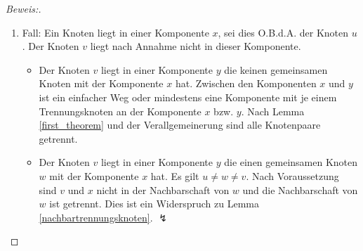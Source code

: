 \begin{proof}[Beweis:]
\begin{enumerate}
\begin{itemize}
\end{itemize}  
\item Fall: Ein Knoten liegt in einer Komponente $x$, sei dies O.B.d.A. der Knoten $u$. Der Knoten $v$ liegt nach Annahme nicht in dieser Komponente. 
\begin{itemize}
\item Der Knoten $v$ liegt in einer Komponente $y$ die keinen gemeinsamen Knoten mit der Komponente $x$ hat. Zwischen den Komponenten $x$ und $y$ ist ein einfacher Weg oder mindestens eine Komponente mit je einem Trennungsknoten an der Komponente $x$ bzw. $y$. Nach Lemma \ref{first_theorem} und der Verallgemeinerung sind alle Knotenpaare getrennt.
\item Der Knoten $v$ liegt in einer Komponente $y$ die einen gemeinsamen Knoten $w$ mit der Komponente $x$ hat. Es gilt $u \neq w \neq v$. Nach Voraussetzung sind $v$ und $x$ nicht in der Nachbarschaft von $w$ und die Nachbarschaft von $w$ ist getrennt. Dies ist ein Widerspruch zu Lemma \ref{nachbartrennungsknoten}. $\lightning$
\end{itemize}  
\end{enumerate}
\vspace{-2mm}
\end{proof}

\vspace{-12mm}
